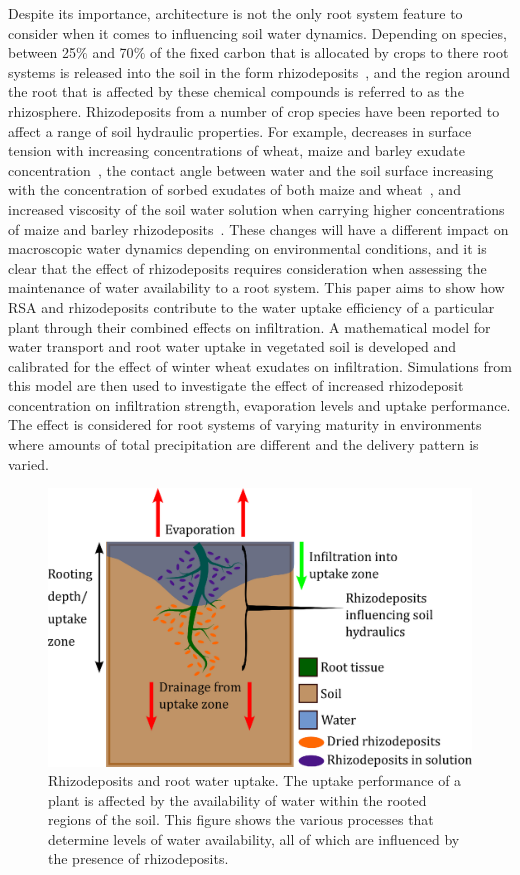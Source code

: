 \documentclass[11pt,a4paper]{article}
\numberwithin{equation}{section}
\begin{document}
Despite its importance, architecture is not the only root system feature to consider when it comes to influencing soil water dynamics. Depending on species, between 25$\%$ and 70$\%$ of the fixed carbon that is allocated by crops to there root systems is released into the soil in the form rhizodeposits~\citep{mcgrail2020trait}, and the region around the root that is affected by these chemical compounds is referred to as the rhizosphere. Rhizodeposits from a number of crop species have been reported to affect a range of soil hydraulic properties. For example, decreases in surface tension with increasing concentrations of wheat, maize and barley exudate concentration~\citep{naveed2019surface, read2003plant, read1997surface}, the contact angle between water and the soil surface increasing with the concentration of sorbed exudates of both maize and wheat~\citep{ahmed2016drying,benard2018pore,naveed2019surface,zickenrott2016efficient}, and increased viscosity of the soil water solution when carrying higher concentrations of maize and barley rhizodeposits~\citep{naveed2019surface}. These changes will have a different impact on macroscopic water dynamics depending on environmental conditions, and it is clear that the effect of rhizodeposits requires consideration when assessing the maintenance of water availability to a root system. This paper aims to show how RSA and rhizodeposits contribute to the water uptake efficiency of a particular plant through their combined effects on infiltration. A mathematical model for water transport and root water uptake in vegetated soil is developed and calibrated for the effect of winter wheat exudates on infiltration. Simulations from this model are then used to investigate the effect of increased rhizodeposit concentration on infiltration strength, evaporation levels and uptake performance. The effect is considered for root systems of varying maturity in environments where amounts of total precipitation are different and the delivery pattern is varied.

\begin{figure}
	\centering
	\includegraphics[width = 0.75\linewidth, keepaspectratio]{concept_figure_10_10_24.eps}
	\caption{Rhizodeposits and root water uptake. The uptake performance of a plant is affected by the availability of water within the rooted regions of the soil. This figure shows the various processes that determine levels of water availability, all of which are influenced by the presence of rhizodeposits.}
	\label{figure: processes}
\end{figure}
\end{document}
